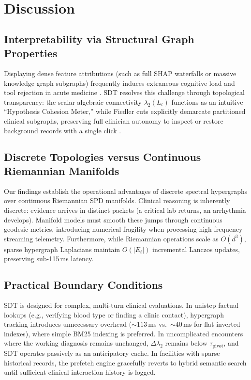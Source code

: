\documentclass[12pt]{article}
\begin{document}
\section*{Discussion}

\subsection*{Interpretability via Structural Graph Properties}

Displaying dense feature attributions (such as full SHAP waterfalls or massive knowledge graph subgraphs) frequently induces extraneous cognitive load and tool rejection in acute medicine \cite{ghassemi2021false}. SDT resolves this challenge through topological transparency: the scalar algebraic connectivity $\lambda_2(L_t)$ functions as an intuitive ``Hypothesis Cohesion Meter,'' while Fiedler cuts explicitly demarcate partitioned clinical subgraphs, preserving full clinician autonomy to inspect or restore background records with a single click \cite{goddard2012automation}.

\subsection*{Discrete Topologies versus Continuous Riemannian Manifolds}

Our findings establish the operational advantages of discrete spectral hypergraphs over continuous Riemannian SPD manifolds. Clinical reasoning is inherently discrete: evidence arrives in distinct packets (a critical lab returns, an arrhythmia develops). Manifold models must smooth these jumps through continuous geodesic metrics, introducing numerical fragility when processing high-frequency streaming telemetry. Furthermore, while Riemannian operations scale as $O(d^3)$, sparse hypergraph Laplacians maintain $O(|E_t|)$ incremental Lanczos updates, preserving sub-115\,ms latency.

\subsection*{Practical Boundary Conditions}
SDT is designed for complex, multi-turn clinical evaluations. In unistep factual lookups (e.g., verifying blood type or finding a clinic contact), hypergraph tracking introduces unnecessary overhead ($\sim 113$\,ms vs.\ $\sim 40$\,ms for flat inverted indexes), where simple BM25 indexing is preferred. In uncomplicated encounters where the working diagnosis remains unchanged, $\Delta \lambda_2$ remains below $\tau_{\text{pivot}}$, and SDT operates passively as an anticipatory cache. In facilities with sparse historical records, the prefetch engine gracefully reverts to hybrid semantic search until sufficient clinical interaction history is logged.
\end{document}

